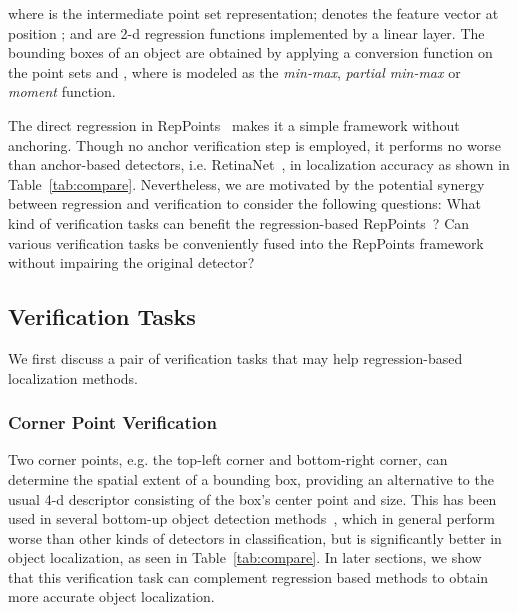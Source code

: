 \documentclass{article}
\begin{document}
where  is the intermediate point set representation;  denotes the feature vector at position ;  and  are 2-d regression functions implemented by a linear layer. The bounding boxes of an object are obtained by applying a conversion function  on the point sets  and , where  is modeled as the \emph{min-max}, \emph{partial min-max} or \emph{moment} function.

The direct regression in RepPoints~\cite{yang19reppts} makes it a simple framework without anchoring. Though no anchor verification step is employed, it performs no worse than anchor-based detectors, i.e. RetinaNet~\cite{RetinaNet}, in localization accuracy as shown in Table~\ref{tab:compare}. Nevertheless, we are motivated by the potential synergy between regression and verification to consider the following questions: 
What kind of verification tasks can benefit the regression-based RepPoints~\cite{yang19reppts}? Can various verification tasks be conveniently fused into the RepPoints framework without impairing the original detector?

\subsection{Verification Tasks}

We first discuss a pair of verification tasks that may help regression-based localization methods.

\subsubsection{Corner Point Verification}

Two corner points, e.g. the top-left corner and bottom-right corner, can determine the spatial extent of a bounding box, providing an alternative to the usual 4-d descriptor consisting of the box's center point and size. This has been used in several bottom-up object detection methods~\cite{CornerNet, ExtremeNet, Denet}, which in general perform worse than other kinds of detectors in classification, but is significantly better in object localization, as seen in Table~\ref{tab:compare}. In later sections, we show that this verification task can complement regression based methods to obtain more accurate object localization.
\end{document}
